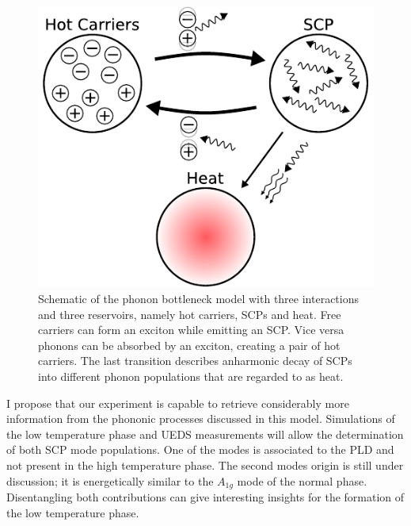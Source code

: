 \begin{figure}[!t]
	\begin{minipage}{0.5\columnwidth}
		\includegraphics[width=\columnwidth]{figs/phonon_bottleneck.pdf}
	\end{minipage}
	\hspace{0.04\columnwidth}
	\begin{minipage}{0.45\columnwidth}
		\caption{Schematic of the phonon bottleneck model with three interactions and three reservoirs, namely hot carriers, SCPs and heat. Free carriers can form an exciton while emitting an SCP. Vice versa phonons can be absorbed by an exciton, creating a pair of hot carriers. The last transition describes anharmonic decay of SCPs into different phonon populations that are regarded to as heat.}
		\label{fig:model}
	\end{minipage}
\end{figure}

I propose that our experiment is capable to retrieve considerably more information from the phononic processes discussed in this model.
Simulations of the low temperature phase and \ac{UEDS} measurements will allow the determination of both \ac{SCP} mode populations.
One of the modes is associated to the \ac{PLD} and not present in the high temperature phase.
The second modes origin is still under discussion; it is energetically similar to the $A_{1g}$ mode of the normal phase\cite{holy1977}.
Disentangling both contributions can give interesting insights for the formation of the low temperature phase.

